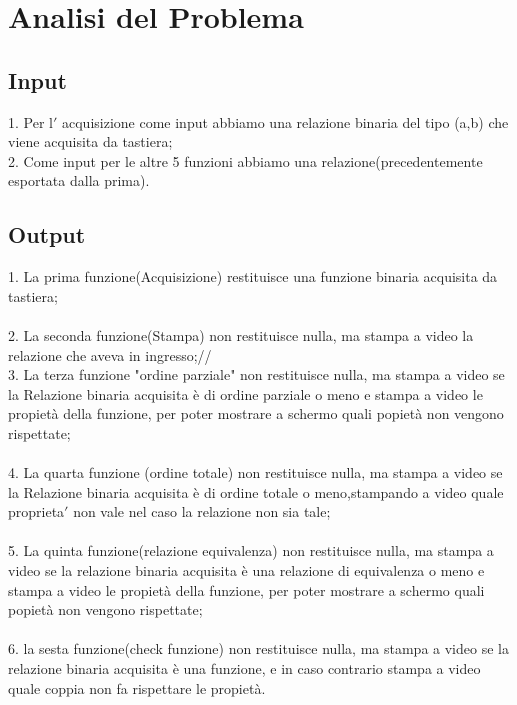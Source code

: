 \documentclass[11pt, a4paper, titlepage, block]{article}
\begin{document}
	\section{Analisi del Problema}
	\subsection{Input}
	
	
	1. Per l$'$ acquisizione come input abbiamo una relazione binaria del tipo (a,b) che viene   acquisita da tastiera;\\
	2. Come input per le altre 5 funzioni abbiamo una relazione(precedentemente esportata dalla prima).\\
	\subsection{Output}
	
	
	1. La prima funzione(Acquisizione) restituisce una funzione binaria acquisita da tastiera;\\
	\\
	2. La seconda funzione(Stampa) non restituisce nulla, ma stampa a video la relazione che aveva in ingresso;//
	\\
	3. La terza funzione "ordine parziale" non restituisce nulla, ma stampa a video se la Relazione binaria acquisita \`e di ordine parziale o meno e stampa a video le propiet\`a della funzione, per poter mostrare a schermo quali popiet\`a non vengono rispettate;\\
	\\
	4. La quarta funzione (ordine totale) non restituisce nulla, ma stampa a video se la Relazione binaria acquisita \`e di ordine totale o meno,stampando a video quale proprieta$'$  non vale nel caso la relazione non sia tale;\\
	\\
	5. La quinta funzione(relazione equivalenza) non restituisce nulla, ma stampa a video se la relazione binaria acquisita \`e una relazione di equivalenza o meno e stampa a video le propiet\`a della funzione, per poter mostrare a schermo quali popiet\`a non vengono rispettate;\\
	\\
	6. la sesta funzione(check funzione) non restituisce nulla, ma stampa a video se la relazione binaria acquisita \`e una funzione, e in caso contrario stampa a video quale coppia non fa rispettare le propiet\`a.\\
	
	
	
\end{document}
